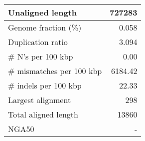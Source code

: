 \documentclass[12pt,a4paper]{article}
\begin{document}
\begin{table}[ht]
\begin{center}
\begin{tabular}{|l*{1}{|r}|}
Unaligned length & 727283 \\ \hline
Genome fraction (\%) & 0.058 \\ \hline
Duplication ratio & 3.094 \\ \hline
\# N's per 100 kbp & 0.00 \\ \hline
\# mismatches per 100 kbp & 6184.42 \\ \hline
\# indels per 100 kbp & 22.33 \\ \hline
Largest alignment & 298 \\ \hline
Total aligned length & 13860 \\ \hline
NGA50 & - \\ \hline
\end{tabular}
\end{center}
\end{table}
\end{document}
